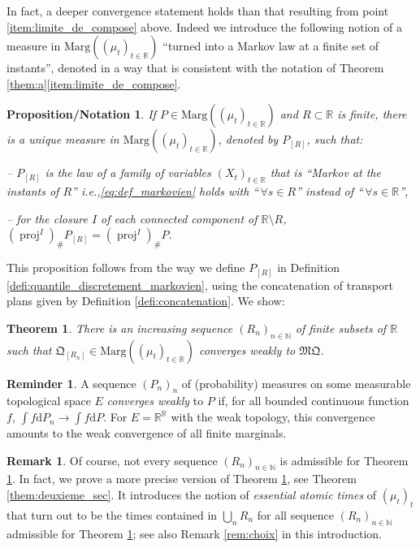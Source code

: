 \documentclass[11pt]{article}
\newcommand{\ie}{i.e.,\xspace}
\theoremstyle{plain}
\newtheorem{themBJ}{Theorem}
\newtheorem{pronotation}[them]{Proposition/Notation}
\theoremstyle{definition}
\newtheorem{rem}[them]{Remark}
\newtheorem{reminder}[them]{Reminder}
\newcommand{\dd}{\mathrm{d}}
\newcommand{\como}{\mathfrak{Q}}
\newcommand{\mq}{\mathfrak{MQ}}
\newcommand{\ma}{\mathrm{Marg}}
\newcommand{\R}{\mathbb{R}}
\newcommand{\N}{\mathbb{N}}
\newcommand{\pr}{\operatorname{proj}}
\begin{document}
In fact, a deeper convergence statement holds than that resulting from point \eqref{item:limite_de_compose} above. Indeed we introduce the following notion of a measure in $\ma((\mu_t)_{t\in\R})$ ``turned into a Markov law at a finite set of instants'', denoted in a way that is consistent with the notation of Theorem \ref{them:a}\eqref{item:limite_de_compose}.

\begin{pronotation}\label{pro:markovinise_fini1} If $P\in\ma((\mu_t)_{t\in\R})$ and $R\subset \R$ is finite, there is a unique measure in $\ma((\mu_t)_{t\in\R})$, denoted by $P_{[R]}$, such that:

-- $P_{[R]}$ is the law of a family of variables $(X_t)_{t\in\R}$ that is ``Markov at the instants of\/ $R$'' \ie \eqref{eq:def_markovien} holds with ``$\,\forall s\in R$'' instead of ``$\,\forall s\in\R$'',

-- for the closure $I$ of each connected component of $\R\setminus R$, $(\pr^I)_\# P_{[R]}=(\pr^I)_\# P$.
\end{pronotation}

This proposition follows from the way we define $P_{[R]}$ in Definition \ref{defi:quantile_discretement_markovien}, using the concatenation of transport plans given by Definition \ref{defi:concatenation}. We show:

\begin{themBJ}\label{them:b}There is an increasing sequence $(R_n)_{n\in\N}$ of finite subsets of $\R$ such that $\como_{[R_n]}\in\ma((\mu_t)_{t\in\R})$ converges weakly to $\mq$.
\end{themBJ}

\begin{reminder}\label{reminder:weak_convergence} A sequence $(P_n)_n$ of (probability) measures on some measurable topological space $E$ \emph{converges weakly} to $P$ if, for all bounded continuous function $f$, $\int f\dd P_n\to\int f\dd P$. For $E=\R^\R$ with the weak topology, this convergence amounts to the weak convergence of all finite marginals.
\end{reminder}

\begin{rem} Of course, not every sequence $(R_n)_{n\in \N}$ is admissible for Theorem \ref{them:b}. In fact, we prove a more precise version of Theorem \ref{them:b}, see Theorem \ref{them:deuxieme_sec}. It introduces the notion of \emph{essential atomic times} of $(\mu_t)_t$ that turn out to be the times contained in $\bigcup_n R_n$ for all sequence $(R_n)_{n\in \N}$ admissible for Theorem \ref{them:b}; see also Remark \ref{rem:choix} in this introduction.
\end{rem}
\end{document}
